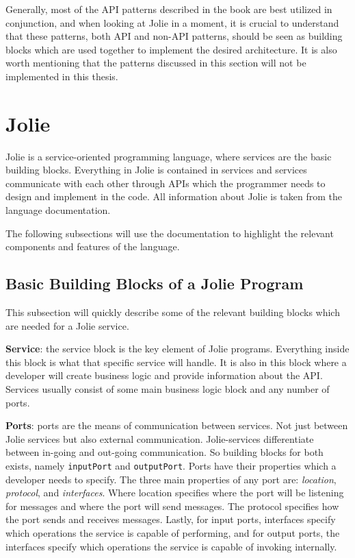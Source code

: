 Generally, most of the API patterns described in the book are best utilized in conjunction,
and when looking at Jolie in a moment, it is crucial to understand that these patterns, both API and non-API patterns,
should be seen as building blocks which are used together to implement the desired architecture.
It is also worth mentioning that the patterns discussed in this section will not be implemented in this thesis.

\section{Jolie}
Jolie is a service-oriented programming language, where services are the basic building blocks.
Everything in Jolie is contained in services and services communicate with each other through APIs which the programmer needs to design and implement in the code. All information about Jolie 
is taken from the language documentation. \cite{jolie}

The following subsections will use the documentation to highlight the relevant components and features of the language.

\subsection{Basic Building Blocks of a Jolie Program}
This subsection will quickly describe some of the relevant building blocks which are needed for a Jolie service.

\textbf{Service}: the service block is the key element of Jolie programs. Everything inside this block is what that specific service will handle. It is also 
in this block where a developer will create business logic and provide information about the API. Services usually consist of some main business logic block and any number of ports.

\textbf{Ports}: ports are the means of communication between services. Not just between Jolie services but also external communication.
Jolie-services differentiate between in-going and out-going communication. So building blocks for both exists, namely \texttt{inputPort} and \texttt{outputPort}.
Ports have their properties which a developer needs to specify. The three main properties of any port are: \textit{location}, \textit{protocol}, and \textit{interfaces}.
Where location specifies where the port will be listening for messages and where the port will send messages.
The protocol specifies how the port sends and receives messages. Lastly, for input ports, interfaces specify which
operations the service is capable of performing, and for output ports, the interfaces specify which
operations the service is capable of invoking internally. 


